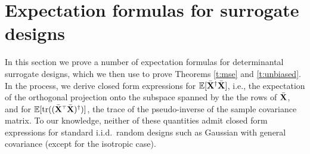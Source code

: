 \documentclass[11pt]{article}
\begin{document}
\section{Expectation formulas for surrogate designs}
\label{s:expectations}
In this section we prove a number of expectation formulas for
determinantal surrogate designs, which we then use to prove Theorems \ref{t:mse}
and \ref{t:unbiased}. In the process, we derive closed form
expressions for  $\mathbb E[{\bar{\mathbf X}}^\dagger{\bar{\mathbf X}}]$, i.e., the expectation of the
orthogonal projection onto the subspace spanned by the the rows of
${\bar{\mathbf X}}$, and for $\E[\tr((\Xb^\top\Xb)^\dagger)]$, the trace of the
pseudo-inverse of the sample covariance matrix. To our knowledge,
neither of these quantities admit closed form expressions for standard
i.i.d.~random designs such as Gaussian with general covariance (except
for the isotropic case).
\end{document}

